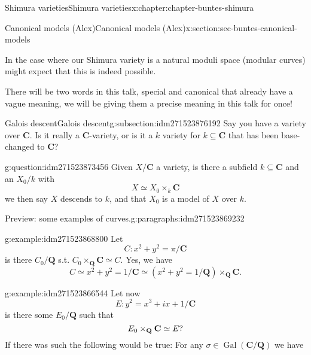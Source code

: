 \documentclass[oneside,10pt,]{book}
\numberwithin{equation}{section}
\newcommand{\QQ}{\mathbf{Q}}
\newcommand{\CC}{\mathbf{C}}
\newcommand{\Gal}[2]{\operatorname{Gal}(#1/#2)}
\begin{document}
\begin{chapterptx}{Shimura varieties}{}{Shimura varieties}{}{}{x:chapter:chapter-buntes-shimura}
\begin{sectionptx}{Canonical models (Alex)}{}{Canonical models (Alex)}{}{}{x:section:sec-buntes-canonical-models}
\begin{introduction}{}
\par
In the case where our Shimura variety is a natural moduli space (modular curves) might expect that this is indeed possible.%
\par
There will be two words in this talk, special and canonical that already have a vague meaning, we will be giving them a precise meaning in this talk for once!%
\end{introduction}%
%
%
\typeout{************************************************}
\typeout{************************************************}
%
\begin{subsectionptx}{Galois descent}{}{Galois descent}{}{}{g:subsection:idm271523876192}
Say you have a variety over \(\CC\). Is it really a \(\CC\)-variety, or is it a \(k\) variety for \(k \subseteq \CC\) that has been base-changed to \(\CC\)?%
\begin{question}{}{g:question:idm271523873456}%
Given \(X/\CC\) a variety, is there a subfield \(k \subseteq \CC\) and an \(X_0/k\) with%
\begin{equation*}
X \simeq X_0 \times_k \CC
\end{equation*}
we then say \(X\) descends to \(k\), and that \(X_0\) is a model of \(X\) over \(k\).%
\end{question}
\begin{paragraphs}{Preview: some examples of curves.}{g:paragraphs:idm271523869232}%
\begin{example}{}{g:example:idm271523868800}%
Let%
\begin{equation*}
C \colon x^2+ y^2 = \pi/\CC
\end{equation*}
is there \(C_0/\QQ\) s.t. \(C_0\times_\QQ \CC \simeq C\). Yes, we have%
\begin{equation*}
C \simeq x^2 + y^2 = 1/\CC \simeq (x^2 + y^2 = 1/\QQ )\times_{\QQ} \CC\text{.}
\end{equation*}
%
\end{example}
\begin{example}{}{g:example:idm271523866544}%
Let now%
\begin{equation*}
E \colon y^2 = x^3 + ix + 1/\CC
\end{equation*}
is there some \(E_0/\QQ\) such that%
\begin{equation*}
E_0\times_{\QQ} \CC  \simeq E\text ?
\end{equation*}
If there was such the following would be true: For any \(\sigma\in \Gal{\CC}{\QQ}\) we have%
\begin{equation*}

\end{equation*}
\end{example}
\end{paragraphs}
\end{subsectionptx}
\end{sectionptx}
\end{chapterptx}
\end{document}
